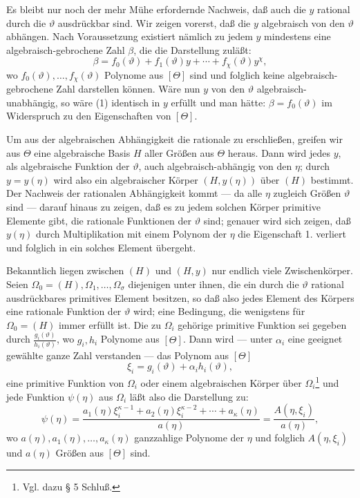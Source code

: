 \documentclass[11pt]{article}
\begin{document}
Es bleibt nur noch der mehr Mühe erfordernde Nachweis, daß auch die $y$ rational
durch die $\vartheta$ ausdrückbar sind. Wir zeigen vorerst, daß die $y$
algebraisch von den $\vartheta$ abhängen. Nach Voraussetzung existiert nämlich
zu jedem $y$ mindestens eine algebraisch-gebrochene Zahl $\beta$, die die
Darstellung zuläßt:
\begin{equation}
\beta=f_0(\vartheta)+f_1(\vartheta)y+\cdots+f_\chi(\vartheta)y^\chi,
\tag{1}
\end{equation}
wo $f_0(\vartheta),\ldots,f_\chi(\vartheta)$ Polynome aus $[\Theta]$ sind und
folglich keine algebraisch-gebrochene Zahl darstellen können. Wäre nun $y$ von
den $\vartheta$ algebraisch-unabhängig, so wäre (1) identisch in $y$ erfüllt und
man hätte: $\beta=f_0(\vartheta)$ im Widerspruch zu den Eigenschaften von
$[\Theta]$.

Um aus der algebraischen Abhängigkeit die rationale zu erschließen, greifen wir
aus $\Theta$ eine algebraische Basis $H$ aller Größen aus $\Theta$ heraus. Dann
wird jedes $y$, als algebraische Funktion der $\vartheta$, auch
algebraisch-abhängig von den $\eta$; durch $y=y(\eta)$ wird also ein
algebraischer Körper $(H,y(\eta))$ über $(H)$ bestimmt. Der Nachweis der
rationalen Abhängigkeit kommt --- da alle $\eta$ zugleich Größen $\vartheta$
sind --- darauf hinaus zu zeigen, daß es zu jedem solchen Körper primitive
Elemente gibt, die rationale Funktionen der $\vartheta$ sind; genauer wird sich
zeigen, daß $y(\eta)$ durch Multiplikation mit einem Polynom der $\eta$ die
Eigenschaft 1. verliert und folglich in ein solches Element übergeht.

Bekanntlich liegen zwischen $(H)$ und $(H,y)$ nur endlich viele Zwischenkörper.
Seien $\Omega_0=(H),\Omega_1,\ldots,\Omega_\sigma$ diejenigen unter ihnen, die
ein durch die $\vartheta$ rational ausdrückbares primitives Element besitzen, so
daß also jedes Element des Körpers eine rationale Funktion der $\vartheta$ wird;
eine Bedingung, die wenigstens für $\Omega_0=(H)$ immer erfüllt ist. Die zu
$\Omega_i$ gehörige primitive Funktion sei gegeben durch
$\frac{g_i(\vartheta)}{h_i(\vartheta)}$, wo $g_i,h_i$ Polynome aus $[\Theta]$.
Dann wird --- unter $\alpha_i$ eine geeignet gewählte ganze Zahl verstanden ---
das Polynom aus $[\Theta]$
\[
 \xi_i=g_i(\vartheta)+\alpha_i h_i(\vartheta),
\]
eine primitive Funktion von $\Omega_i$ oder einem algebraischen Körper über
$\Omega_i$\footnote{Vgl. dazu § 5 Schluß.} und jede Funktion $\psi(\eta)$ aus
$\Omega_i$ läßt also die Darstellung zu:
\begin{equation}
\psi(\eta)=
\frac{a_1(\eta)\xi_i^{\kappa-1}+a_2(\eta)\xi_i^{\kappa-2}+\cdots+a_\kappa(\eta)}
     {a(\eta)}
=\frac{A(\eta,\xi_i)}{a(\eta)},
\tag{2}
\end{equation}
wo $a(\eta),a_1(\eta),\ldots,a_\kappa(\eta)$ ganzzahlige Polynome der $\eta$
und folglich $A(\eta,\xi_i)$ und $a(\eta)$ Größen aus $[\Theta]$ sind.
\end{document}

